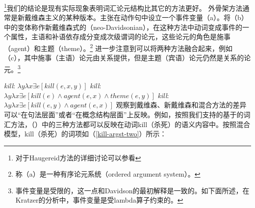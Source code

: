 \footnote{%
对于Haugereid方法的详细讨论可以参看%
}我们的结论是现有实际现象表明词汇论元结构比其它的方法更好。 
外骨架方法通常是新戴维森主义的某种版本。\citet{Davidson67a-u}主张在动作句中设立一个事件变量（a）。\citet{Dowty89b-u}将（b）中的变体称作新戴维森式的（neo-Davidsonian），在这种方法中动词变成事件的一个属性，主语和补语依存成分变成次级谓词的论元，这些论元的角色是施事（agent）和主题（theme）。\footnote{%
\citet{Dowty89b-u}称（a）是一种有序论元系统（ordered argument system）。
} \citet{Kratzer96a}进一步注意到可以将两种方法融合起来，例如（c），其中施事（主语）论元由关系提供，但是主题（宾语）论元仍然是关系的论元。\footnote{%
事件变量是受限的，这一点和Davidson的最初解释是一致的。如下面所述，在Kratzer的分析中，事件变量是受lambda算子约束的。} 

\eal\settowidth{} \label{neokill1}
\ex \emph{kill}: $\lambda y\lambda x\exists e[kill(e, x, y)]$  
\ex \emph{kill}: $\lambda y\lambda x\exists e[kill(e) \wedge agent(e, x) \wedge theme(e, y)]$ 
\ex \emph{kill}: $\lambda y\lambda x\exists e[kill(e,y) \wedge agent(e, x)]$ 
\zl
\citet{Kratzer96a}观察到戴维森、新戴维森和混合方法的差异可以“在句法层面”或者“在概念结构层面”上反映\citep[--111]{Kratzer96a}。例如，按照我们支持的基于的词汇方法，（）中的三种方法都可以反映在动词kill（杀死）的语义内容中。按照混合模型，kill（杀死）的词项如（\ref{kill-argst-two}）所示：

